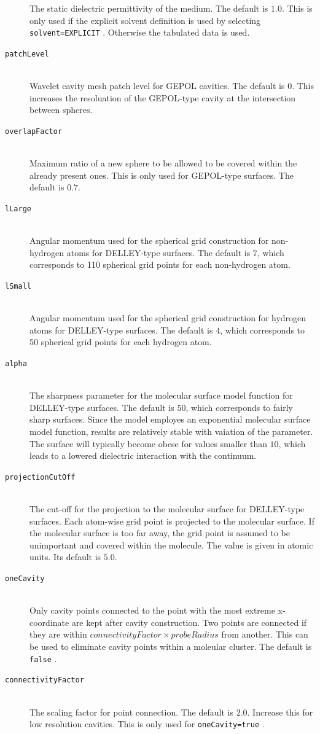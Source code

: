 \documentclass[bibliography=totocnumbered,a4paper,10pt,oneside]{scrbook}
\newcommand{\ttt}[1]{%
  \begingroup\setlength{\fboxsep}{1pt}%
  \colorbox{serenity-green!30}{\texttt{\hspace*{2pt}\vphantom{(g}#1\hspace*{2pt}}}%
  \endgroup
}
\begin{document}
\begin{description}
    The static dielectric permittivity of the medium. The default is $1.0$. This is only used if 
    the explicit solvent definition is used by selecting \ttt{solvent=EXPLICIT}. Otherwise the tabulated
    data is used.  
    \item [\texttt{patchLevel}]\hfill \\
    Wavelet cavity mesh patch level for GEPOL cavities. The default is $0$. This increases the resoluation of the 
    GEPOL-type cavity at the intersection between spheres.
    \item [\texttt{overlapFactor}]\hfill \\
    Maximum ratio of a new sphere to be allowed to be covered within the already present ones. This is only used for 
    GEPOL-type surfaces. The default is $0.7$.  
    \item [\texttt{lLarge}]\hfill \\
    Angular momentum used for the spherical grid construction for non-hydrogen atoms for DELLEY-type surfaces. The default
    is $7$, which corresponds to 110 spherical grid points for each  non-hydrogen atom.
    \item [\texttt{lSmall}]\hfill \\
    Angular momentum used for the spherical grid construction for hydrogen atoms for DELLEY-type surfaces. The default
    is $4$, which corresponds to 50 spherical grid points for each hydrogen atom.
    \item [\texttt{alpha}]\hfill \\
    The sharpness parameter for the molecular surface model function for DELLEY-type surfaces. The default
    is $50$, which corresponds to fairly sharp surfaces. Since the model employes an exponential 
    molecular surface model function, results are relatively stable with vaiation of the parameter. The surface 
    will typically become obese for values smaller than $10$, which leads to a lowered dielectric interaction with 
    the continuum.
    \item [\texttt{projectionCutOff}]\hfill \\
    The cut-off for the projection to the molecular surface for DELLEY-type surfaces. Each atom-wise grid 
    point is projected to the molecular surface. If the molecular surface is too far away, the grid point is 
    assumed to be unimportant and covered within the molecule. The value is given in atomic units. Its default is 
    $5.0$.
    \item [\texttt{oneCavity}]\hfill \\
    Only cavity points connected to the point with the most extreme
    x-coordinate are kept after cavity construction. Two points are connected if they are within
    $connectivityFactor\times probeRadius$ from another. This can be used to eliminate cavity points within a 
    moleular cluster. The default is \ttt{false}.
    \item [\texttt{connectivityFactor}]\hfill \\
    The scaling factor for point connection. The default is $2.0$. Increase this for low
    resolution cavities. This is only used for \ttt{oneCavity=true}.
 \end{description}
\end{document}
